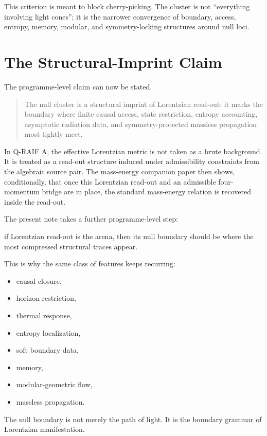 \documentclass[12pt,a4paper]{article}
\theoremstyle{definition}
\theoremstyle{remark}
\newcommand{\tightlist}{%
  \setlength{\itemsep}{0pt}\setlength{\parskip}{0pt}}
\begin{document}
This criterion is meant to block cherry-picking. The cluster is not
``everything involving light cones''; it is the narrower convergence of
boundary, access, entropy, memory, modular, and symmetry-locking
structures around null loci.

\section{The Structural-Imprint
Claim}\label{the-structural-imprint-claim}

The programme-level claim can now be stated.

\begin{quote}
The null cluster is a structural imprint of Lorentzian read-out: it
marks the boundary where finite causal access, state restriction,
entropy accounting, asymptotic radiation data, and symmetry-protected
massless propagation most tightly meet.
\end{quote}

In Q-RAIF A, the effective Lorentzian metric is not taken as a brute
background. It is treated as a read-out structure induced under
admissibility constraints from the algebraic source pair. The
mass-energy companion paper then shows, conditionally, that once this
Lorentzian read-out and an admissible four-momentum bridge are in place,
the standard mass-energy relation is recovered inside the read-out.

The present note takes a further programme-level step:

if Lorentzian read-out is the arena, then its null boundary should be
where the most compressed structural traces appear.

This is why the same class of features keeps recurring:

\begin{itemize}
\tightlist
\item
  causal closure,
\item
  horizon restriction,
\item
  thermal response,
\item
  entropy localization,
\item
  soft boundary data,
\item
  memory,
\item
  modular-geometric flow,
\item
  massless propagation.
\end{itemize}

The null boundary is not merely the path of light. It is the boundary
grammar of Lorentzian manifestation.
\end{document}
